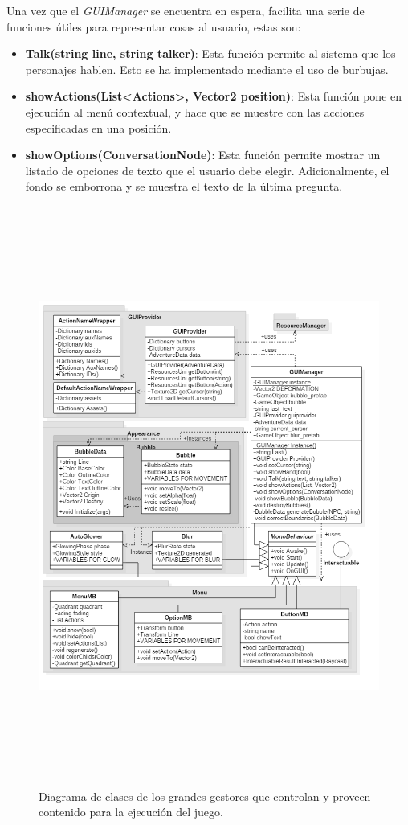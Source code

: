 Una vez que el \textit{GUIManager} se encuentra en espera, facilita una serie de funciones útiles para representar cosas al usuario, estas son:
\begin{itemize}
	\item \textbf{Talk(string line, string talker)}: Esta función permite al sistema que los personajes hablen. Esto se ha implementado mediante el uso de burbujas.
	
	\item \textbf{showActions(List<Actions>, Vector2 position)}: Esta función pone en ejecución al menú contextual, y hace que se muestre con las acciones especificadas en una posición.
	
	\item \textbf{showOptions(ConversationNode)}: Esta función permite mostrar un listado de opciones de texto que el usuario debe elegir. Adicionalmente, el fondo se emborrona y se muestra el texto de la última pregunta.
	
\end{itemize}


\begin{figure}[h!]
	\centerline{\includegraphics[height=7.5in]{figures/it2/GUIManager.png}}
	\caption[GameLogic Grandes Gestores - Versión Final]{Diagrama de clases de los grandes gestores que controlan y proveen contenido para la ejecución del juego.}
	\label{guimanagerit2}
\end{figure}

